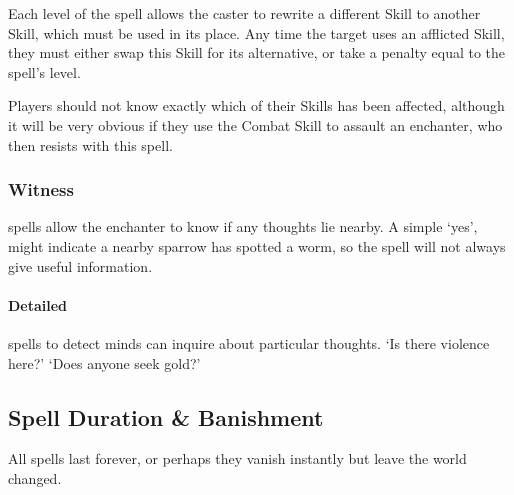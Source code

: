 \begin{multicols}{2}
        Each level of the spell allows the caster to rewrite a different Skill to another Skill, which must be used in its place.
        Any time the target uses an afflicted Skill, they must either swap this Skill for its alternative, or take a penalty equal to the spell's level.

        Players should not know exactly which of their Skills has been affected, although it will be very obvious if they use the Combat Skill to assault an enchanter, who then resists with this spell.
  \subsubsection{Witness}
    spells allow the enchanter to know if any thoughts lie nearby.
    A simple `yes', might indicate a nearby sparrow has spotted a worm, so the spell will not always give useful information.

      \paragraph{Detailed}
        spells to detect minds can inquire about particular thoughts.
        `Is there violence here?'
        `Does anyone seek gold?'

\subsection{Spell Duration \& Banishment}

All spells last forever, or perhaps they vanish instantly but leave the world changed.


\end{multicols}
